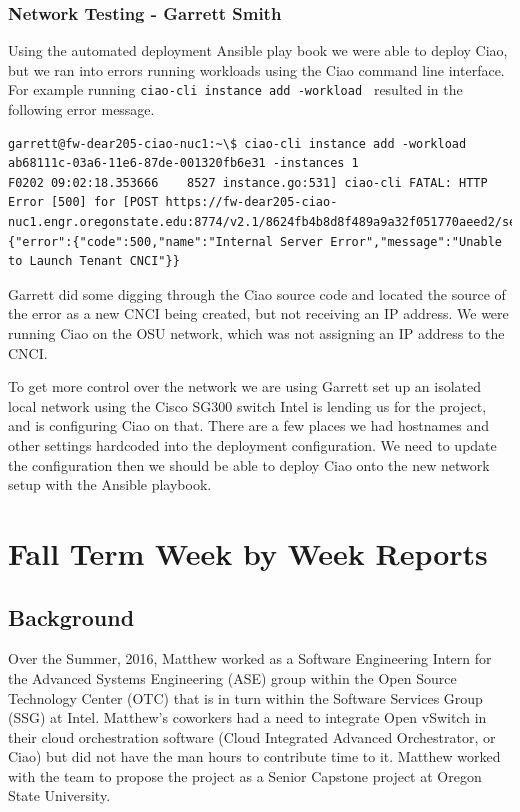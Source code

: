 \documentclass[10pt,onecolumn,journal,draftclsnofoot]{IEEEtran}
\begin{document}
\subsubsection{Network Testing - Garrett Smith}

Using the automated deployment Ansible play book we were able to deploy Ciao,
but we ran into errors running workloads using the Ciao command line interface.
For example running \texttt{ciao-cli instance add -workload } resulted in the
following error message.

\begin{lstlisting}[caption = Failing to run a workload]
garrett@fw-dear205-ciao-nuc1:~\$ ciao-cli instance add -workload ab68111c-03a6-11e6-87de-001320fb6e31 -instances 1
F0202 09:02:18.353666    8527 instance.go:531] ciao-cli FATAL: HTTP Error [500] for [POST https://fw-dear205-ciao-nuc1.engr.oregonstate.edu:8774/v2.1/8624fb4b8d8f489a9a32f051770aeed2/servers]: {"error":{"code":500,"name":"Internal Server Error","message":"Unable to Launch Tenant CNCI"}}
\end{lstlisting}

Garrett did some digging through the Ciao source code and located the source of
the error as a new CNCI being created, but not receiving an IP address. We were
running Ciao on the OSU network, which was not assigning an IP address to the
CNCI.

To get more control over the network we are using Garrett set up an isolated
local network using the Cisco SG300 switch Intel is lending us for the project,
and is configuring Ciao on that. There are a few places we had hostnames and
other settings hardcoded into the deployment configuration. We need to update
the configuration then we should be able to deploy Ciao onto the new network
setup 
with the Ansible playbook.

\section{Fall Term Week by Week Reports}

\subsection{Background}

Over the Summer, 2016, Matthew worked as a Software Engineering Intern for the
Advanced Systems Engineering (ASE) group within the Open Source Technology
Center (OTC) that is in turn within the Software Services Group (SSG) at Intel.
Matthew's coworkers had a need to integrate Open vSwitch in their cloud
orchestration software (Cloud Integrated Advanced Orchestrator, or Ciao) but did
not have the man hours to contribute time to it. Matthew worked with the team to
propose the project as a Senior Capstone project at Oregon State University.
\end{document}

